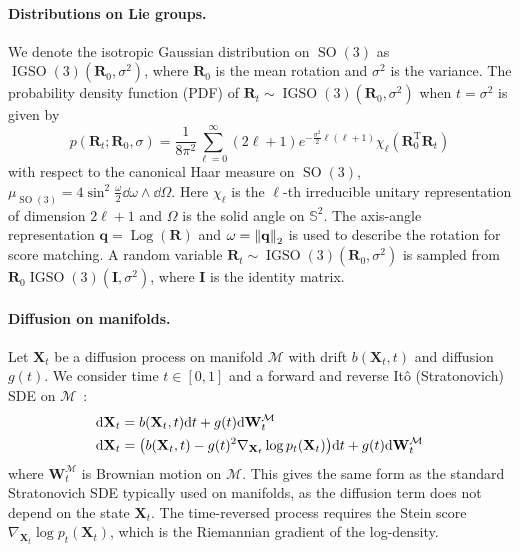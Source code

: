 \documentclass{article}
\theoremstyle{plain}
\theoremstyle{definition}
\theoremstyle{remark}
\DeclareMathOperator{\SO}{SO}
\DeclareMathOperator{\IGSO}{IGSO}
\DeclareMathOperator{\Log}{\operatorname{Log}}
\begin{document}
\paragraph{Distributions on Lie groups.}
We denote the isotropic Gaussian distribution on $\SO(3)$ as $\IGSO(3)(\mathbf{R}_0, \sigma^2)$, where $\mathbf{R}_0$ is the mean rotation and $\sigma^2$ is the variance. The probability density function (PDF) of $\mathbf{R}_t \sim \IGSO(3)(\mathbf{R}_0, \sigma^2)$ when $t=\sigma^2$ is given by
\begin{equation}
    p(\mathbf{R}_t;\mathbf{R}_0, \sigma) = \frac{1}{8\pi^2}\sum_{\ell=0}^{\infty} (2\ell+1)e^{-\frac{\sigma^2}{2}\ell(\ell+1)}\chi_\ell(\mathbf{R}_0^\mathrm{T}\mathbf{R}_t)
\end{equation}
with respect to the canonical Haar measure on $\SO(3)$, $\mu_{\SO(3)} = 4\sin^2\frac{\omega}{2}\dd\omega\wedge\dd\varOmega$. Here $\chi_\ell$ is the $\ell$-th irreducible unitary representation of dimension $2\ell+1$ and $\varOmega$ is the solid angle on $\mathbb{S}^2$. The axis-angle representation $\mathbf{q} = \Log(\mathbf{R})$ and $\omega = \norm{\mathbf{q}}_2$ is used to describe the rotation for score matching. A random variable $\mathbf{R}_t\sim\IGSO(3)(\mathbf{R}_0, \sigma^2)$ is sampled from $\mathbf{R}_0\IGSO(3)(\mathbf{I}, \sigma^2)$, where $\mathbf{I}$ is the identity matrix.

\paragraph{Diffusion on manifolds.}
Let $\mathbf{X}_t$ be a diffusion process on manifold $\mathcal{M}$ with drift $b(\mathbf{X}_t, t)$ and diffusion $g(t)$. We consider time $t\in[0, 1]$ and a forward and reverse It\^o (Stratonovich) SDE on $\mathcal{M}$~\cite{sde_on_manifolds_hsu}:
\begin{align}
    \label{eq:forward_reverse_sde}
    \dd\mathbf{X}_t & = b(\mathbf{X}_t, t) \dd t + g(t) \dd \mathbf{W}_t^\mathcal{M}                                                             \\
    \dd\mathbf{X}_t & = \qty(b(\mathbf{X}_t, t) - g(t)^2 \nabla_{\mathbf{X}_t} \log p_t(\mathbf{X}_t)) \dd t + g(t) \dd \mathbf{W}_t^\mathcal{M}
\end{align}
where $\mathbf{W}_t^\mathcal{M}$ is Brownian motion on $\mathcal{M}$. This gives the same form as the standard Stratonovich SDE typically used on manifolds, as the diffusion term does not depend on the state $\mathbf{X}_t$. The time-reversed process requires the Stein score $\nabla_{\mathbf{X}_t} \log p_t(\mathbf{X}_t)$, which is the Riemannian gradient of the log-density.
\end{document}
